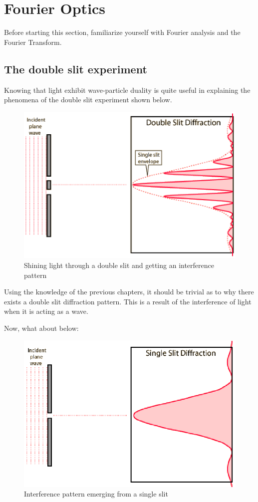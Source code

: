 \documentclass{article}
\begin{document}
\pagebreak
\section{Fourier Optics}
Before starting this section, familiarize yourself with Fourier analysis and the Fourier Transform.
\subsection{The double slit experiment}
Knowing that light exhibit wave-particle duality is quite useful in explaining the phenomena of the double slit experiment shown below.

\begin{figure}[!phtb]
    \centering
    \includegraphics[width=0.5\linewidth]{img/Double_Slit.eps}
    \caption{Shining light through a double slit and getting an interference pattern}
    \label{fig:double_slit}
\end{figure}

Using the knowledge of the previous chapters, it should be trivial as to why there exists a double slit diffraction pattern. This is a result of the interference of light when it is acting as a wave.

Now, what about below:
\begin{figure}[!phbt]
    \centering
    \includegraphics[width=0.5\linewidth]{img/Single_Slit.eps}
    \caption{Interference pattern emerging from a single slit}
    \label{fig:single_slit}
\end{figure}
\end{document}
